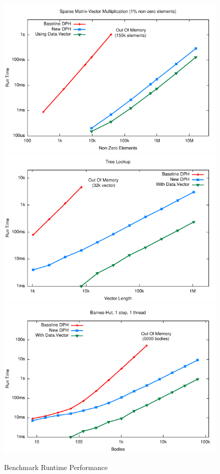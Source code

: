 \begin{figure}
\includegraphics[scale=0.8]{data/smvm}
\includegraphics[scale=0.8]{data/indices}
\includegraphics[scale=0.8]{data/nbody}
\caption{Benchmark Runtime Performance}
\label{figure:Benchmarks}
\end{figure}

